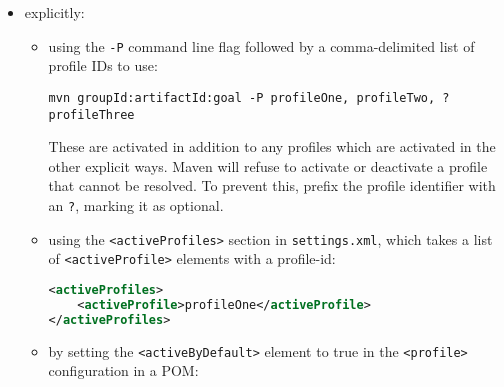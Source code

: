\documentclass[8pt, table, xcdraw]{article}%
\begin{document}
\begin{itemize}
    \item explicitly:
    \begin{itemize}
        \item using the \lstinline{-P} command line flag followed by a comma-delimited list of profile IDs to use:

        \begin{lstlisting}
mvn groupId:artifactId:goal -P profileOne, profileTwo, ?profileThree
        \end{lstlisting}
        
        
        These are activated in addition to any profiles which are activated in the other explicit ways. Maven will refuse to activate or deactivate a profile that cannot be resolved. To prevent this, prefix the profile identifier with an \lstinline{?}, marking it as optional.
        \item using the \lstinline{<activeProfiles>} section in \lstinline{settings.xml}, which takes a list of \lstinline{<activeProfile>} elements with a profile-id:

        \begin{lstlisting}[language=XML]
<activeProfiles>
    <activeProfile>profileOne</activeProfile>
</activeProfiles>
        \end{lstlisting}
        \item by setting the \lstinline{<activeByDefault>} element to true in the \lstinline{<profile>} configuration in a POM:


\end{itemize}
\end{itemize}
\end{document}
